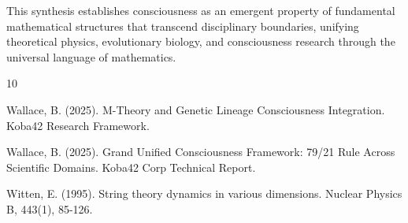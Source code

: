 \documentclass[12pt]{article}
\begin{document}
This synthesis establishes consciousness as an emergent property of fundamental mathematical structures that transcend disciplinary boundaries, unifying theoretical physics, evolutionary biology, and consciousness research through the universal language of mathematics.


\begin{thebibliography}{10}

Wallace, B. (2025). M-Theory and Genetic Lineage Consciousness Integration. Koba42 Research Framework.

Wallace, B. (2025). Grand Unified Consciousness Framework: 79/21 Rule Across Scientific Domains. Koba42 Corp Technical Report.

Witten, E. (1995). String theory dynamics in various dimensions. Nuclear Physics B, 443(1), 85-126.

\end{thebibliography}
\end{document}
